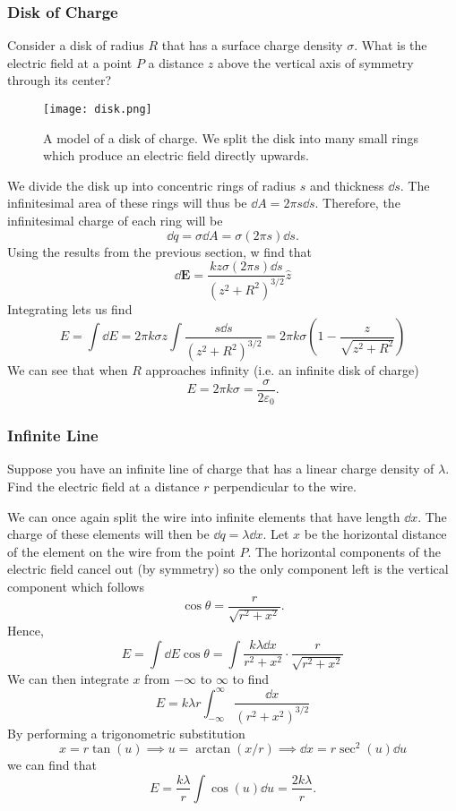 \documentclass[12pt]{article}
\let\vec\mathbf
\begin{document}
    \subsubsection{Disk of Charge}
    \begin{prob}
    Consider a disk of radius $R$ that has a surface charge density $\sigma$. What is the electric field at a point $P$ a distance $z$ above the vertical axis of symmetry through its center? 
    \end{prob}
    \begin{figure}[H]
  \centering
      \texttt{[image: disk.png]}
      \caption{A model of a disk of charge. We split the disk into many small rings which produce an electric field directly upwards.}
  \end{figure}
    We divide the disk up into concentric rings of radius $s$ and thickness $\dd s$. The infinitesimal area of these rings will thus be $\dd A = 2\pi s \dd s$. Therefore, the infinitesimal charge of each ring will be 
    \[\dd q = \sigma \dd A = \sigma (2\pi s) \dd s.\]
    Using the results from the previous section, w find that 
    \[\dd \vec E = \frac{kz\sigma (2\pi s) \dd s}{(z^2 + R^2)^{3/2}}\hat z\]
    Integrating lets us find 
    \[E = \int \dd E = 2\pi k\sigma z\int \frac{s \dd s}{(z^2 + R^2)^{3/2}} = 2\pi k \sigma \left(1 - \frac{z}{\sqrt{z^2 + R^2}}\right)\]
    We can see that when $R$ approaches infinity (i.e. an infinite disk of charge)
    \[E = 2\pi k \sigma = \frac{\sigma}{2\varepsilon_0}.\]
    \subsubsection{Infinite Line}
    \begin{prob}
    Suppose you have an infinite line of charge that has a linear charge density of $\lambda$. Find the electric field at a distance $r$ perpendicular to the wire. 
    \end{prob}
    We can once again split the wire into infinite elements that have length $\dd x$. The charge of these elements will then be $\dd q = \lambda \dd x$. Let $x$ be the horizontal distance of the element on the wire from the point $P$. The horizontal components of the electric field cancel out (by symmetry) so the only component left is the vertical component which follows 
    \[\cos\theta = \frac{r}{\sqrt{r^2 + x^2}}.\]
    Hence, 
    \[E = \int \dd E \cos\theta = \int \frac{k\lambda \dd x}{r^2 + x^2} \cdot \frac{r}{\sqrt{r^2 + x^2}}\]
    We can then integrate $x$ from $-\infty$ to $\infty$ to find 
    \[E = k\lambda r \int_{-\infty}^{\infty} \frac{\dd x}{(r^2 + x^2)^{3/2}}\]
    By performing a trigonometric substitution 
    \[x = r\tan (u) \implies u = \arctan(x/r) \implies \dd x =r\sec^2(u)\dd u\]
    we can find that 
    \[E = \frac{k\lambda}{r} \int \cos (u) \dd u = \frac{2k\lambda}{r}.\]
\end{document}

